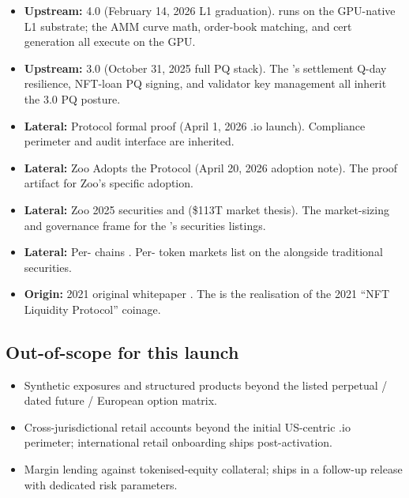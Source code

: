 \begin{itemize}[leftmargin=1.2em]
  \item \textbf{Upstream:} \Zoo{} 4.0 \cite{zoo-4-0} (February 14,
        2026 L1 graduation). \DEX{} runs on the GPU-native L1
        substrate; the AMM curve math, order-book matching, and
        cert generation all execute on the GPU.
  \item \textbf{Upstream:} \Zoo{} 3.0 \cite{zoo-3-0} (October 31,
        2025 full PQ stack). The \DEX{}'s settlement Q-day
        resilience, NFT-loan PQ signing, and validator key
        management all inherit the 3.0 PQ posture.
  \item \textbf{Lateral:} \Liquidity{} Protocol formal proof
        \cite{liquidity-protocol-formal} (April 1, 2026
        \Liquidity{}.io launch). Compliance perimeter and audit
        interface are inherited.
  \item \textbf{Lateral:} Zoo Adopts the \Liquidity{} Protocol
        \cite{zoo-adopts-liquidity-protocol} (April 20, 2026
        adoption note). The proof artifact for Zoo's specific
        adoption.
  \item \textbf{Lateral:} Zoo 2025 securities and \DAO{}
        \cite{zoo-2025-securities-and-dao} (\$113T market thesis).
        The market-sizing and governance frame for the \DEX{}'s
        securities listings.
  \item \textbf{Lateral:} Per-\LLM{} chains \cite{zoo-per-llm-chains}.
        Per-\LLM{} token markets list on the \DEX{} alongside
        traditional securities.
  \item \textbf{Origin:} \Zoo{} 2021 original whitepaper
        \cite{zoo-2021}. The \DEX{} is the realisation of the 2021
        ``NFT Liquidity Protocol'' coinage.
\end{itemize}

\subsection{Out-of-scope for this launch}

\begin{itemize}[leftmargin=1.2em]
  \item Synthetic exposures and structured products beyond the
        listed perpetual / dated future / European option matrix.
  \item Cross-jurisdictional retail accounts beyond the initial
        US-centric \Liquidity{}.io perimeter; international
        retail onboarding ships post-activation.
  \item Margin lending against tokenised-equity collateral; ships
        in a follow-up release with dedicated risk parameters.
\end{itemize}

